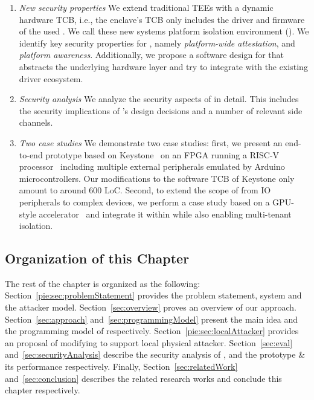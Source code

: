 \begin{enumerate}
  \item \emph{New security properties} We extend traditional TEEs with a dynamic hardware TCB, i.e., the enclave's TCB only includes the driver and firmware of the used \sphw. We call these new systems platform isolation environment (\name{}). We identify key security properties for \name{}, namely \emph{platform-wide attestation}, and \emph{platform awareness}. Additionally, we propose a software design for \name that abstracts the underlying hardware layer and try to integrate with the existing driver ecosystem. 
  
  \item \emph{Security analysis} We analyze the security aspects of \name in detail. This includes the security implications of \name{}'s design decisions and a number of relevant side channels.
  
  \item \emph{Two case studies} We demonstrate two case studies: first, we present an end-to-end prototype based on Keystone~\cite{keystone} on an FPGA running a RISC-V processor~\cite{ariane} including multiple external peripherals emulated by Arduino microcontrollers. Our modifications to the software TCB of Keystone only amount to around 600 LoC. Second, to extend the scope of \name from IO peripherals to complex devices, we perform a case study based on a GPU-style accelerator~\cite{zaruba2020manticore} and integrate it within \name{} while also enabling multi-tenant isolation.

\end{enumerate}


\subsection{Organization of this Chapter}

The rest of the chapter is organized as the following: Section~\ref{pie:sec:problemStatement} provides the problem statement, system and the attacker model. Section~\ref{sec:overview} proves an overview of our approach. Section~\ref{sec:approach} and~\ref{sec:programmingModel} present the main idea and the programming model of \name respectively. Section~\ref{pie:sec:localAttacker} provides an proposal of modifying \name to support local physical attacker. Section~\ref{sec:eval} and~\ref{sec:securityAnalysis} describe the security analysis of \name, and  the \name prototype \& its performance respectively. Finally, Section~\ref{sec:relatedWork} and~\ref{sec:conclusion} describes the related research works and conclude this chapter respectively. 